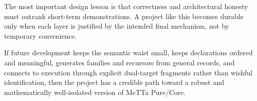\documentclass[11pt]{article}
\newcommand{\MeTTa}{\textup{MeTTa}}
\begin{document}
The most important design lesson is that correctness and architectural honesty
must outrank short-term demonstrations. A project like this becomes durable only
when each layer is justified by the intended final mechanism, not by temporary
convenience.

If future development keeps the semantic waist small, keeps declarations ordered
and meaningful, generates families and recursors from general records, and
connects to execution through explicit dual-target fragments rather than wishful
identification, then the project has a credible path toward a robust and
mathematically well-isolated version of \MeTTa{} Pure/Core.
\end{document}

